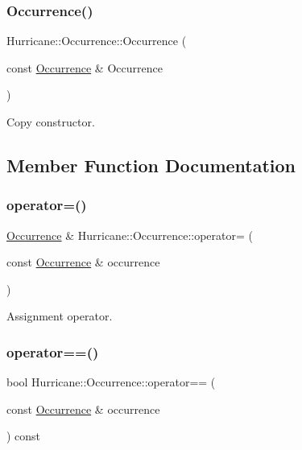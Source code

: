 \subsubsection{\texorpdfstring{Occurrence()}{Occurrence()}\hspace{0.1cm}{\footnotesize\ttfamily [3/3]}}
{\footnotesize\ttfamily Hurricane\+::\+Occurrence\+::\+Occurrence (\begin{DoxyParamCaption}\item[{const \mbox{\hyperlink{classHurricane_1_1Occurrence}{Occurrence}} \&}]{Occurrence }\end{DoxyParamCaption})}

Copy constructor. 

\subsection{Member Function Documentation}
\mbox{\label{classHurricane_1_1Occurrence_a389472d0d5b121a4e091511c8003cb47}} 
\subsubsection{\texorpdfstring{operator=()}{operator=()}}
{\footnotesize\ttfamily \mbox{\hyperlink{classHurricane_1_1Occurrence}{Occurrence}} \& Hurricane\+::\+Occurrence\+::operator= (\begin{DoxyParamCaption}\item[{const \mbox{\hyperlink{classHurricane_1_1Occurrence}{Occurrence}} \&}]{occurrence }\end{DoxyParamCaption})}

Assignment operator. \mbox{\label{classHurricane_1_1Occurrence_accae7f6611cb5985478d58fc793dc3e0}} 
\subsubsection{\texorpdfstring{operator==()}{operator==()}}
{\footnotesize\ttfamily bool Hurricane\+::\+Occurrence\+::operator== (\begin{DoxyParamCaption}\item[{const \mbox{\hyperlink{classHurricane_1_1Occurrence}{Occurrence}} \&}]{occurrence }\end{DoxyParamCaption}) const}


